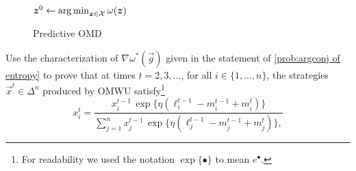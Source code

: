 \documentclass{homework}
\newcommand{\negent}{\omega}
\begin{document}
\begin{figure}[th]
\begin{minipage}[t]{.485\linewidth}
        \SetInd{0.25em}{0.4em}
        \begin{algorithm}[H]\caption{Predictive OMD}\label{algo:predictive omd}
            \DontPrintSemicolon
            \BlankLine
            $\vec{z}^0 \gets \argmin_{\vec{z} \in \cX} \negent(\vec{z})$\;\label{line:omd setup}\vspace{.0mm}
            \Hline{}
            \Fn{\normalfont\textsc{NextStrategy}($\vec{m}^{t}$)}{
                \Comment{\color{commentcolor} Set $\vec{m}^t = \vec{0}$ for non-predictive version]}\vspace{1mm}
                \Return{$\displaystyle\argmax_{\xhat \in \cX} \mleft\{(\vec{m}^t)^\top \xhat - \frac{1}{\eta}\div{\xhat}{\vec{z}^{t-1}}\mright\}$}\hspace*{-3cm}\;\label{line:omd next xt}\vspace{1mm}
            }
            \Hline{}
        \end{algorithm}
    \end{minipage}
\end{figure}


\begin{problem}[10 points]
    Use the characterization of $\nabla\negent^*(\vec{g})$ given in the statement of \cref{prob:argconj of entropy} to prove that at times $t = 2,3,\dots$, for all $i \in \{1, \dots, n\}$, the strategies $\vec{x}^t \in \Delta^n$ produced by OMWU satisfy\footnote{For readability we used the notation $\exp\{\bullet\}$ to mean $e^\bullet$.}
    \[
        x^t_i = \frac{x^{t-1}_i\,\exp\{\eta(\ell^{t-1}_i - m^{t-1}_i + m^t_i)\}}{
            \sum_{j=1}^n x^{t-1}_j\,\exp\{\eta(\ell^{t-1}_j - m^{t-1}_j + m^t_j)\},
        }
    \]
\end{problem}
\begin{solution}
\end{solution}
\end{document}
